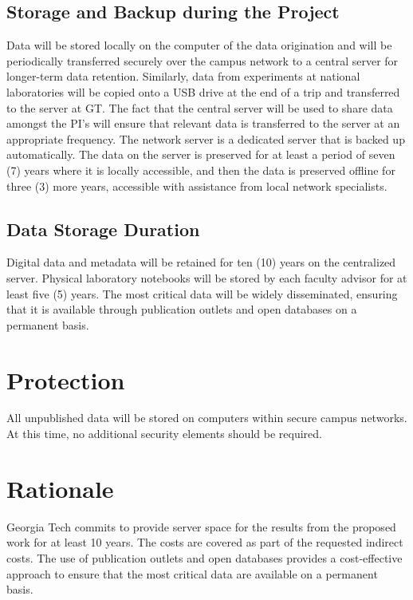 \subsection{Storage and Backup during the Project}
Data will be stored locally on the computer of the data origination and will be periodically transferred securely over the campus network to a central server for longer-term data retention. Similarly, data from experiments at national laboratories will be copied onto a USB drive at the end of a trip and transferred to the server at GT. The fact that the central server will be used to share data amongst the PI’s will ensure that relevant data is transferred to the server at an appropriate frequency. The network server is a dedicated server that is backed up automatically. The data on the server is preserved for at least a period of seven (7) years where it is locally accessible, and then the data is preserved offline for three (3) more years, accessible with assistance from local network specialists. 

\subsection{Data Storage Duration} Digital data and metadata will be retained for ten (10) years on the centralized server. Physical laboratory notebooks will be stored by each faculty advisor for at least five (5) years. The most critical data will be widely disseminated, ensuring that it is available through publication outlets and open databases on a permanent basis.

\section{Protection}
All unpublished data will be stored on computers within secure campus networks. At this time, no additional security elements should be required.

\section{Rationale}
Georgia Tech commits to provide server space for the results from the proposed work for at least 10 years. The costs are covered as part of the requested indirect costs. The use of publication outlets and open databases provides a cost-effective approach to ensure that the most critical data are available on a permanent basis.
